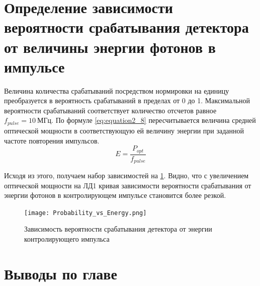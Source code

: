 





\section{Определение зависимости вероятности срабатывания детектора от величины энергии фотонов в импульсе} \label{sec:ch2/sec8}
Величина количества срабатываний посредством нормировки на единицу преобразуется в вероятность срабатываний в пределах от 0 до 1. Максимальной вероятности срабатываний соответствует количество отсчетов равное $f_{pulse} = 10~МГц$. По формуле \ref{eq:equation2_8} пересчитывается величина средней оптической мощности в соответствующую ей величину энергии при заданной частоте повторения импульсов.  
\begin{equation}
 \label{eq:equation2_8}
	E = \frac{P_{opt}}{f_{pulse}}
\end{equation}
 
 Исходя из этого, получаем набор зависимостей на \ref{fig:Probability_vs_Energy}. Видно, что с увеличением оптической мощности на ЛД1 кривая зависимости вероятности срабатывания от энергии фотонов в контролирующем импульсе становится более резкой.  
 
 \begin{figure}[ht]
  \centering
  \texttt{[image: Probability\_vs\_Energy.png]}
  \caption{Зависимость вероятности срабатывания детектора от энергии контролирующего импульса}
  \label{fig:Probability_vs_Energy}
\end{figure}


\pagebreak
\section{Выводы по главе} \label{ch:ch2/sect12}
